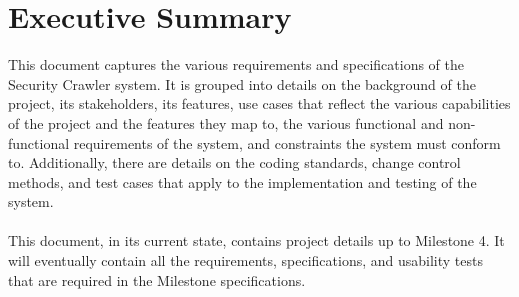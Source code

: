 \section{Executive Summary}
This document captures the various requirements and specifications of the Security Crawler system.  It is grouped into details on the background of the project, its stakeholders, its features, use cases that reflect the various capabilities of the project and the features they map to, the various functional and non-functional requirements of the system, and constraints the system must conform to.
Additionally, there are details on the coding standards, change control methods, and test cases that apply to the implementation and testing of the system.\\\\
This document, in its current state, contains project details up to Milestone 4.  It will eventually contain all the requirements, specifications, and usability tests that are required in the Milestone specifications.\\\\

